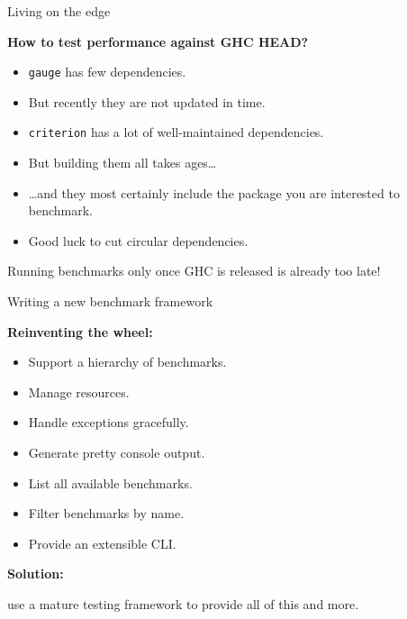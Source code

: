 \documentclass[handout]{beamer}
\begin{document}
\begin{frame}[fragile]{Living on the edge}

\centerline{\bf How to test performance against GHC HEAD?}

\begin{itemize}[<+->]
\item {\tt gauge} has few dependencies.
\item But recently they are not updated in time.
\item {\tt criterion} has a lot of well-maintained dependencies.
\item But building them all takes ages\dots
\item \dots and they most certainly include the package you are interested to benchmark.
\item Good luck to cut circular dependencies.
\end{itemize}

\bigskip\pause

Running benchmarks only once GHC is released is already too late!

\end{frame}

\begin{frame}{Writing a new benchmark framework}

\pause

{\bf Reinventing the wheel:}
\begin{itemize}[<+->]
\item Support a hierarchy of benchmarks.
\item Manage resources.
\item Handle exceptions gracefully.
\item Generate pretty console output.
\item List all available benchmarks.
\item Filter benchmarks by name.
\item Provide an extensible CLI.
\end{itemize}

\pause
\bigskip

{\bf Solution:} \par
use a mature testing framework to provide all of this and more.

\end{frame}
\end{document}
